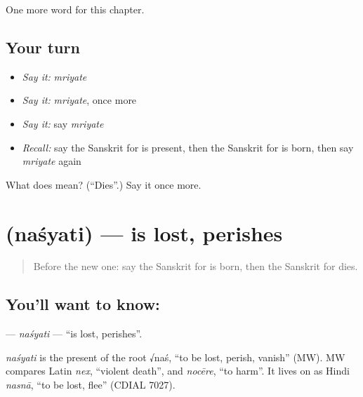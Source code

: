 \begin{grammarlens}[title={What you've built}]
One more word for this chapter.
\end{grammarlens}

\subsection*{Your turn}
\begin{itemize}
\raggedright
  \item \emph{Say it:} \emph{mriyate}
  \item \emph{Say it:} \emph{mriyate}, once more
  \item \emph{Say it:} say \emph{mriyate}
  \item \emph{Recall:} say the Sanskrit for is present, then the Sanskrit for is born, then say \emph{mriyate} again
\end{itemize}

\begin{tcolorbox}[breakable,colback=teal!4,colframe=teal!35!black,title={Before you move on}]
What does  mean? (\textquotedblleft{}Dies\textquotedblright{}.) Say it once more.
\end{tcolorbox}
\section[\texorpdfstring{\sk{नश्यति} (naśyati)}{नश्यति (naśyati)}]{ (naśyati) — is lost, perishes}

\label{lesson:SA-C232-nasyati}



\begin{quote}
Before the new one: say the Sanskrit for is born, then the Sanskrit for dies.
\end{quote}

\subsection*{You'll want to know: }
\textbf{} — \emph{naśyati} — \textquotedblleft{}is lost, perishes\textquotedblright{}.

\begin{cousinweb}
\emph{naśyati} is the present of the root √naś, \textquotedblleft{}to be lost, perish, vanish\textquotedblright{} (MW). MW compares Latin \emph{nex}, \textquotedblleft{}violent death\textquotedblright{}, and \emph{nocēre}, \textquotedblleft{}to harm\textquotedblright{}. It lives on as Hindi \emph{nasnā}, \textquotedblleft{}to be lost, flee\textquotedblright{} (CDIAL 7027).
\end{cousinweb}

